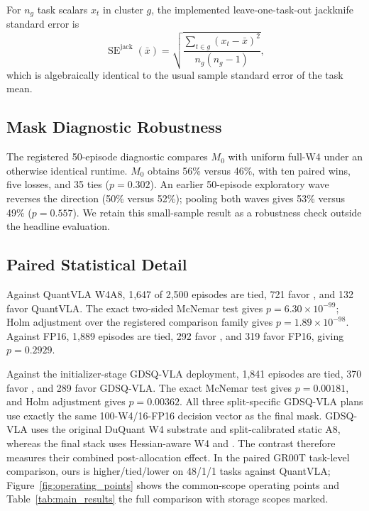 For $n_g$ task scalars $x_t$ in cluster $g$, the implemented leave-one-task-out jackknife standard error is
\begin{equation}
 \operatorname{SE}^{\mathrm{jack}}(\bar{x})=
 \sqrt{\frac{\sum_{t\in g}(x_t-\bar{x})^2}{n_g(n_g-1)}},
 \label{eq:task_jackknife}
\end{equation}
which is algebraically identical to the usual sample standard error of the task mean.

\subsection{Mask Diagnostic Robustness}
\label{sec:mask_diagnostic}

The registered 50-episode diagnostic compares $M_0$ with uniform full-W4 under an otherwise identical runtime. $M_0$ obtains 56\% versus 46\%, with ten paired wins, five losses, and 35 ties ($p=0.302$). An earlier 50-episode exploratory wave reverses the direction (50\% versus 52\%); pooling both waves gives 53\% versus 49\% ($p=0.557$). We retain this small-sample result as a robustness check outside the headline evaluation.

\subsection{Paired Statistical Detail}

Against QuantVLA W4A8, 1,647 of 2,500 episodes are tied, 721 favor \method, and 132 favor QuantVLA. The exact two-sided McNemar test gives $p=6.30\times10^{-99}$; Holm adjustment over the registered comparison family gives $p=1.89\times10^{-98}$. Against FP16, 1,889 episodes are tied, 292 favor \method, and 319 favor FP16, giving $p=0.2929$.

Against the initializer-stage GDSQ-VLA deployment, 1,841 episodes are tied, 370 favor \method, and 289 favor GDSQ-VLA. The exact McNemar test gives $p=0.00181$, and Holm adjustment gives $p=0.00362$. All three split-specific GDSQ-VLA plans use exactly the same 100-W4/16-FP16 decision vector as the final mask. GDSQ-VLA uses the original DuQuant W4 substrate and split-calibrated static A8, whereas the final stack uses Hessian-aware W4 and \dyrange. The contrast therefore measures their combined post-allocation effect. In the paired GR00T task-level comparison, ours is higher/tied/lower on 48/1/1 tasks against QuantVLA; Figure~\ref{fig:operating_points} shows the common-scope operating points and Table~\ref{tab:main_results} the full comparison with storage scopes marked.

